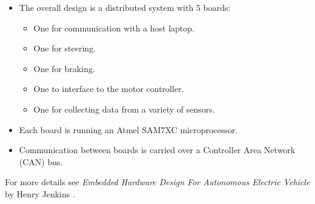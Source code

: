    \renewcommand{\labelitemi}{$\bullet$}
    \renewcommand{\labelitemii}{$\circ$}
    \begin{itemize}
      \item The overall design is a distributed system with 5 boards:
            \begin{itemize}
              \item One for communication with a host laptop.
              \item One for steering.
              \item One for braking.
              \item One to interface to the motor controller.
              \item One for collecting data from a variety of sensors.
            \end{itemize}

      \item Each board is running an Atmel SAM7XC microprocessor.

      \item Communication between boards is carried over a Controller Area
            Network (CAN) bus.

    \end{itemize}

    For more details see \emph{Embedded Hardware Design For Autonomous Electric
    Vehicle} by Henry Jenkins \cite{jenkins_2011}.
